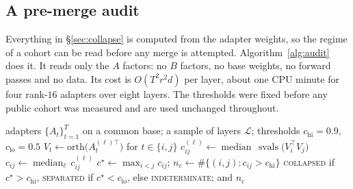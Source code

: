 \subsection{A pre-merge audit}\label{subsec:audit}

Everything in \S\ref{sec:collapse} is computed from the adapter weights, so the
regime of a cohort can be read before any merge is attempted.
Algorithm~\ref{alg:audit} does it. It reads only the $A$ factors: no $B$
factors, no base weights, no forward passes and no data. Its cost is
$O(T^2 r^2 d)$ per layer, about one CPU minute for four rank-$16$ adapters over
eight layers. The thresholds were fixed before any public cohort was measured
and are used unchanged throughout.

\begin{algorithm}[t]
\caption{Pre-merge audit of a LoRA cohort.}
\label{alg:audit}
\begin{algorithmic}[1]
\Require adapters $\{A_t\}_{t=1}^{T}$ on a common base; a sample of layers
  $\mathcal{L}$; thresholds $c_{\mathrm{hi}} = 0.9$, $c_{\mathrm{lo}} = 0.5$
    \State $V_t \gets \mathrm{orth}\bigl(A_t^{(\ell)\top}\bigr)$ for $t \in \{i, j\}$
    \State $c_{ij}^{(\ell)} \gets \operatorname{median}\,
      \operatorname{svals}\bigl(V_i^{\top} V_j\bigr)$
  \EndFor
  \State $c_{ij} \gets \operatorname{median}_{\ell}\, c_{ij}^{(\ell)}$
\EndFor
\State $c^\star \gets \max_{i<j} c_{ij}$;\quad
  $n_{\mathrm{c}} \gets \#\{(i,j) : c_{ij} > c_{\mathrm{hi}}\}$
\State \Return \textsc{collapsed} if $c^\star > c_{\mathrm{hi}}$,
  \textsc{separated} if $c^\star < c_{\mathrm{lo}}$, else
  \textsc{indeterminate}; and $n_{\mathrm{c}}$
\end{algorithmic}
\end{algorithm}

